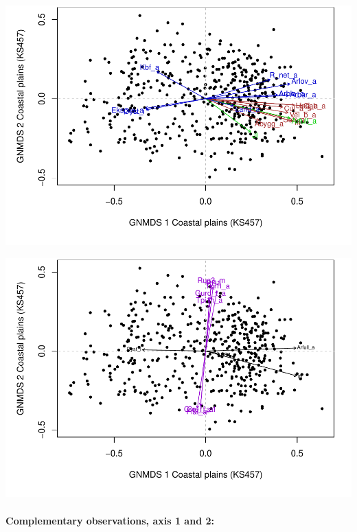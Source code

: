 \documentclass[]{article}
\let\oldparagraph\paragraph
\renewcommand{\paragraph}[1]{\oldparagraph{#1}\mbox{}}
\begin{document}
\includegraphics{Landscape_analysis_example_4_files/figure-latex/unnamed-chunk-9-1.pdf}

\includegraphics{Landscape_analysis_example_4_files/figure-latex/unnamed-chunk-10-1.pdf}

\hypertarget{complementary-observations-axis-1-and-2}{%
\paragraph{Complementary observations, axis 1 and
2:}\label{complementary-observations-axis-1-and-2}}
\end{document}
